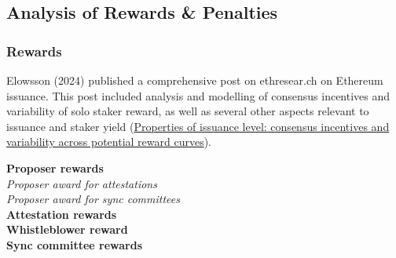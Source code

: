 \subsection{Analysis of Rewards \& Penalties}
\subsubsection{Rewards}
Elowsson (2024) published a comprehensive post on ethresear.ch on Ethereum issuance. This post included analysis and modelling of consensus incentives and variability of solo staker reward, as well as several other aspects relevant to issuance and staker yield (\href{https://ethresear.ch/t/properties-of-issuance-level-consensus-incentives-and-variability-across-potential-reward-curves/18448}{Properties of issuance level: consensus incentives and variability across potential reward curves}).

\noindent
\textbf{Proposer rewards} \\

\noindent
\textit{Proposer award for attestations} \\


\noindent
\textit{Proposer award for sync committees} \\




\noindent
\textbf{Attestation rewards} \\



\noindent
\textbf{Whistleblower reward} \\


\noindent
\textbf{Sync committee rewards} \\



